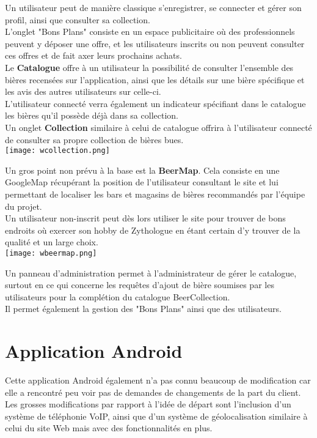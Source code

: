 \documentclass{report}
\begin{document}
		Un utilisateur peut de manière classique s'enregistrer, se connecter et gérer son profil, ainsi que consulter sa collection.\\

		L'onglet "Bons Plans" consiste en un espace publicitaire où des professionnels peuvent y déposer une offre, et les utilisateurs inscrits ou non peuvent consulter ces offres et de fait axer leurs prochains achats.\\

		Le \textbf{Catalogue} offre à un utilisateur la possibilité de consulter l'ensemble des bières recensées sur l'application, ainsi que les détails sur une bière spécifique et les avis des autres utilisateurs sur celle-ci.\\
		L'utilisateur connecté verra également un indicateur spécifiant dans le catalogue les bières qu'il possède déjà dans sa collection.\\
		Un onglet \textbf{Collection} similaire à celui de catalogue offrira à l'utilisateur connecté de consulter sa propre collection de bières bues.\\

		\texttt{[image: wcollection.png]}

		Un gros point non prévu à la base est la \textbf{BeerMap}. Cela consiste en une GoogleMap récupérant la position de l'utilisateur consultant le site et lui permettant de localiser les bars et magasins de bières recommandés par l'équipe du projet.\\
		Un utilisateur non-inscrit peut dès lors utiliser le site pour trouver de bons endroits où exercer son hobby de Zythologue en étant certain d'y trouver de la qualité et un large choix.\\

		\texttt{[image: wbeermap.png]}

		Un panneau d'administration permet à l'administrateur de gérer le catalogue, surtout en ce qui concerne les requêtes d'ajout de bière soumises par les utilisateurs pour la complétion du catalogue BeerCollection.\\
		Il permet également la gestion des "Bons Plans" ainsi que des utilisateurs.\\
		
	\section{Application Android}

		Cette application Android également n'a pas connu beaucoup de modification car elle a rencontré peu voir pas de demandes de changements de la part du client.\\
		Les grosses modifications par rapport à l'idée de départ sont l'inclusion d'un système de téléphonie VoIP, ainsi que d'un système de géolocalisation similaire à celui du site Web mais avec des fonctionnalités en plus.\\
\end{document}
